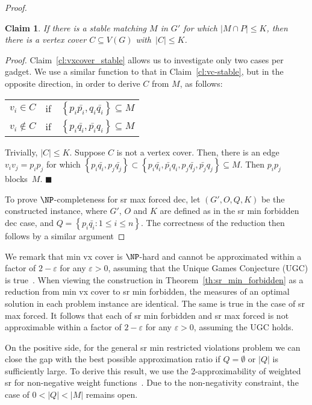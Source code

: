 \documentclass[preprint,12pt]{elsarticle}
\newcommand{\myqed}{$\blacksquare$}
\newcommand{\myproof}{\noindent\textit{Proof. }}
\newtheorem{claim}[theorem]{Claim}
\begin{document}
\begin{proof}
\begin{claim}
	If there is a stable matching $M$ in $G'$ for which $|M \cap P| \leq K$, then there is a vertex cover $C \subseteq V(G)$ with~$|C| \leq K$.
\end{claim}

	\myproof Claim~\ref{cl:vxcover_stable} allows us to investigate only two cases per gadget. We use a similar function to that in Claim~\ref{cl:vc-stable}, but in the opposite direction, in order to derive $C$ from $M$, as follows:
	
	\begin{center}
	\begin{tabular}{ l c l }
	$v_i \in C$& if & $\left\{p_i \bar{p_i}, q_i \bar{q_i}\right\} \subseteq M$ \\
	$v_i \notin C$ & if & $\left\{p_i \bar{q_i}, \bar{p_i} q_i \right\} \subseteq M$
	\end{tabular}
\end{center}
Trivially, $|C| \leq K$. Suppose $C$ is not a vertex cover. Then, there is an edge $v_i v_j = p_i p_j$ for which $\left\{ p_i \bar{q_i}, p_j \bar{q_j} \right\} \subset \left\{p_i \bar{q_i}, \bar{p_i} q_i, p_j \bar{q_j}, \bar{p_j} q_j \right\} \subseteq M$. Then $p_ip_j$ blocks~$M$.  \myqed

To prove $\NP$-completeness for {\sc sr max forced dec}, let $(G',O,Q,K)$ be the constructed instance, where $G'$, $O$ and $K$ are defined as in the {\sc sr min forbidden dec} case, and $Q = \left\{ p_i \bar{q_i}: 1\leq i \leq n\right\}$.  The correctness of the reduction then follows by a similar argument
\end{proof}

We remark that {\sc min vx cover} is $\NP$-hard and cannot be approximated within a factor of $2 - \varepsilon$ for any $\varepsilon>0$, assuming that the Unique Games Conjecture (UGC) is true~\cite{KR08}. When viewing the construction in Theorem~\ref{th:sr_min_forbidden} as a reduction from {\sc min vx cover} to {\sc sr min forbidden}, the measures of an optimal solution in each problem instance are identical.  The same is true in the case of {\sc sr max forced}.  It follows that each of {\sc sr min forbidden} and {\sc sr max forced} is not approximable within a factor of $2 - \varepsilon$ for any $\varepsilon>0$, assuming the UGC holds.


\iffalse
On the positive side, for the general {\sc sr min restricted violations} problem we can close the gap with the best possible approximation ratio if $Q = \emptyset$ or $|Q|$ is sufficiently large. To derive this result, we use the 2-approximability of weighted {\sc sr} for non-negative weight functions~\cite{Fed92,TS98}. Due to the non-negativity constraint, the case of $0 < |Q| < |M|$ remains open.
\end{document}
